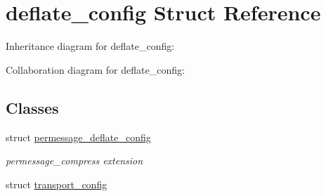 \hypertarget{structdeflate__config}{}\section{deflate\+\_\+config Struct Reference}
\label{structdeflate__config}


Inheritance diagram for deflate\+\_\+config\+:


Collaboration diagram for deflate\+\_\+config\+:
\subsection*{Classes}
\begin{DoxyCompactItemize}
\item 
struct \mbox{\hyperlink{structdeflate__config_1_1permessage__deflate__config}{permessage\+\_\+deflate\+\_\+config}}
\begin{DoxyCompactList}\small\item\em permessage\+\_\+compress extension \end{DoxyCompactList}\item 
struct \mbox{\hyperlink{structdeflate__config_1_1transport__config}{transport\+\_\+config}}
\end{DoxyCompactItemize}
